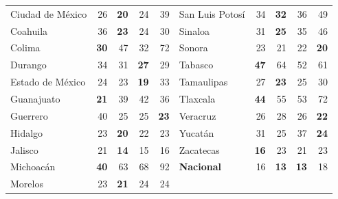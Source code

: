 \begin{table}[t]
\begin{tabular}{l rrrr @{\hskip 5mm} l rrrr}
Ciudad de M\'exico & 26 & \textbf{20} & 24 & 39 & San Luis Potos\'i & 34 & \textbf{32} & 36 & 49\\
Coahuila & 36 & \textbf{23} & 24 & 30 & Sinaloa & 31 & \textbf{25} & 35 & 46\\
Colima & \textbf{30} & 47 & 32 & 72 & Sonora & 23 & 21 & 22 & \textbf{20}\\
Durango & 34 & 31 & \textbf{27} & 29 & Tabasco & \textbf{47} & 64 & 52 & 61\\
Estado de M\'exico & 24 & 23 & \textbf{19} & 33 & Tamaulipas & 27 & \textbf{23} & 25 & 30\\
Guanajuato & \textbf{21} & 39 & 42 & 36 & Tlaxcala & \textbf{44} & 55 & 53 & 72\\
Guerrero & 40 & 25 & 25 & \textbf{23} & Veracruz & 26 & 28 & 26 & \textbf{22}\\
Hidalgo & 23 & \textbf{20} & 22 & 23 & Yucat\'an & 31 & 25 & 37 & \textbf{24}\\
Jalisco & 21 & \textbf{14} & 15 & 16 & Zacatecas & \textbf{16} & 23 & 21 & 23\\
Michoac\'an & \textbf{40} & 63 & 68 & 92 & \textbf{Nacional} & 16 & \textbf{13} & \textbf{13} & 18\\
Morelos & 23 & \textbf{21} & 24 & 24 &  & & & & \\
\bottomrule
\end{tabular}
\end{table}
